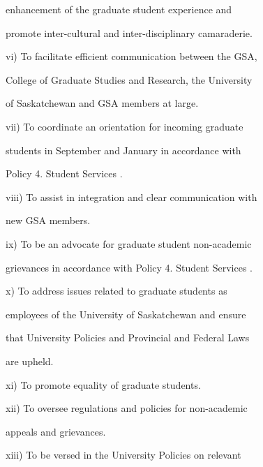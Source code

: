                   enhancement  of  the   graduate  student  experience  and  

                  promote inter-cultural and inter-disciplinary camaraderie.   

  

         vi)      To facilitate efficient communication between the GSA,  

                  College of Graduate Studies and Research, the University  

                  of Saskatchewan and GSA members at large.   

  

         vii)     To   coordinate   an   orientation   for   incoming   graduate  



                  students  in  September  and  January  in  accordance  with  



                  Policy 4. Student Services .   

  

         viii)    To  assist  in  integration  and  clear  communication  with  

                  new GSA members.   

  

         ix)      To  be  an  advocate  for  graduate  student  non-academic  

                  grievances in accordance with Policy 4. Student Services .   

  

         x)       To     address      issues     related     to    graduate       students      as  

                  employees of the University of Saskatchewan and ensure  

                  that University Policies and Provincial and Federal Laws  

                  are upheld.   

  

         xi)      To promote equality of graduate students.   

  

         xii)     To  oversee  regulations  and  policies  for  non-academic  

                  appeals and grievances.   

         xiii)    To  be  versed  in  the  University  Policies  on  relevant  


